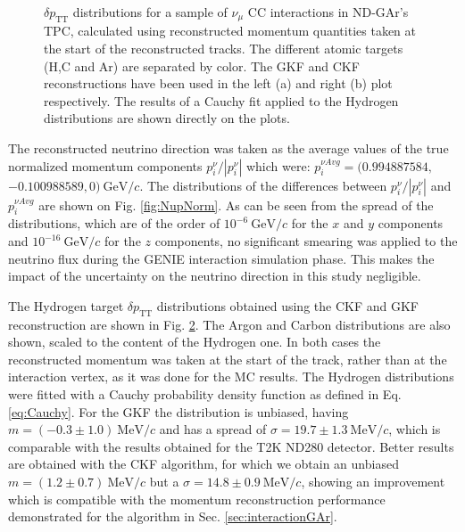 \begin{figure}[t]
\begin{subfigure}[b]{0.48\textwidth}
         \caption{}
         \label{fig:dpTT_ALICEReco}
     \end{subfigure}
        \caption{$\delta p_\text{TT}$ distributions for a sample of $\nu_\mu$ CC interactions in ND-GAr's TPC, calculated using reconstructed momentum quantities taken at the start of the reconstructed tracks. The different atomic targets (H,C and Ar) are separated by color. The GKF and CKF reconstructions have been used in the left (a) and right (b) plot respectively. The results of a Cauchy fit applied to the Hydrogen distributions are shown directly on the plots.} \label{fig:dpTT}
\end{figure}

The reconstructed neutrino direction was taken as the average values of the true normalized momentum components $p^\nu_i/|p^\nu_i|$ which were: $p^{\nu Avg}_i = (0.994887584,$ $ -0.100988589 , 0) \ \text{GeV}/c$. The distributions of the differences between $p^\nu_i/|p^\nu_i|$ and $p^{\nu Avg}_i$ are shown on Fig. \ref{fig:NupNorm}. As can be seen from the spread of the distributions, which are of the order of $10^{-6} \ \text{GeV}/c$ for the $x$ and $y$ components and $10^{-16} \ \text{GeV}/c$ for the $z$ components, no significant smearing was applied to the neutrino flux during the GENIE interaction simulation phase. This makes the impact of the uncertainty on the neutrino direction in this study negligible. 

The Hydrogen target $\delta p_\text{TT}$ distributions obtained using the CKF and GKF reconstruction are shown in Fig. \ref{fig:dpTT}. The Argon and Carbon distributions are also shown, scaled to the content of the Hydrogen one. In both cases the reconstructed momentum was taken at the start of the track, rather than at the interaction vertex, as it was done for the MC results. The Hydrogen distributions were fitted with a Cauchy probability density function as defined in Eq. \ref{eq:Cauchy}. For the GKF the distribution is unbiased, having $m=(-0.3\pm1.0) \ \text{MeV}/c$ and has a spread of $\sigma = 19.7\pm1.3 \ \text{MeV}/c$, which is comparable with the results obtained for the T2K ND280 detector. Better results are obtained with the CKF algorithm, for which we obtain an unbiased $m=(1.2\pm0.7) \ \text{MeV}/c$ but a $\sigma = 14.8\pm0.9 \ \text{MeV}/c$, showing an improvement which is compatible with the momentum reconstruction performance demonstrated for the algorithm in Sec. \ref{sec:interactionGAr}.

